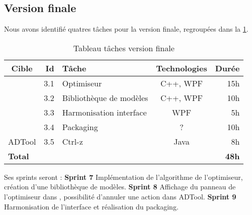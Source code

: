 	\subsection{Version finale}
		Nous avons identifié quatres tâches pour la version finale, regroupées dans la \ttable{} \ref{tab:taches_units_3}.
		\begin{table}[h]
			\centering
			\begin{tabular}{|c|r|l|c|r|}
				\hline
				\textbf{Cible} & \textbf{Id} & \textbf{Tâche} & \textbf{Technologies} & \textbf{Durée}\\
				\hline

				\multirow{4}{*}{\glasir{}} & 3.1 & Optimiseur & C++, WPF & 15h\\
				\cline{2-5}
				 & 3.2 & Bibliothèque de modèles & C++, WPF & 10h\\
				\cline{2-5}
				 & 3.3 & Harmonisation interface & WPF & 5h\\
				\cline{2-5}
				 & 3.4 & Packaging & ? & 10h\\
				\hline

				\multirow{1}{*}{ADTool} & 3.5 & Ctrl-z & \multirow{1}{*}{Java} & 8h\\
				\hline

				\multicolumn{4}{|l|}{\bf Total} & {\bf 48h}\\
				\hline
			\end{tabular}
			\caption{Tableau tâches version finale}
			\label{tab:taches_units_3}
		\end{table}
		Ses sprints seront :\newline
		\textbf{Sprint 7} Implémentation de l'algorithme de l'optimiseur, création d'une bibliothèque de modèles.\newline
		\textbf{Sprint 8} Affichage du panneau de l'optimiseur dans \glasir{}, possibilité d'annuler une action dans ADTool.\newline
		\textbf{Sprint 9} Harmonisation de l'interface et réalisation du packaging. \newline